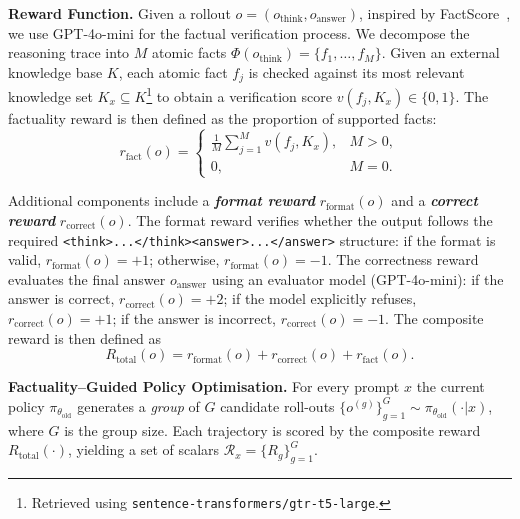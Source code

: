 \medskip
\noindent\textbf{Reward Function.}  
Given a rollout \(o=(o_{\mathrm{think}},o_{\mathrm{answer}})\), inspired by FactScore~\citep{min2023factscore}, we use GPT-4o-mini for the factual verification process. 
We decompose the reasoning trace into \(M\) atomic facts \(\Phi(o_{\mathrm{think}})=\{f_1,\dots,f_M\}\). 
Given an external knowledge base $K$, each atomic fact $f_j$ is checked against its most relevant knowledge set $K_x \subseteq K$\footnote{Retrieved using \texttt{sentence-transformers/gtr-t5-large}.} to obtain a verification score $v(f_j, K_x) \in \{0,1\}$.
The factuality reward is then defined as the proportion of supported facts:
\begin{equation}
\label{eq:factual-score}
r_{\mathrm{fact}}(o)=
\begin{cases}
\displaystyle \frac{1}{M}\sum_{j=1}^{M}v(f_j,K_x), & M>0,\\[6pt]
0, & M=0 .
\end{cases}
\end{equation}

Additional components include a \emph{\textbf{format reward}} \(r_{\mathrm{format}}(o)\) and a \emph{\textbf{correct reward}} \(r_{\mathrm{correct}}(o)\). 
The format reward verifies whether the output follows the required \texttt{<think>...</think><answer>...</answer>} structure: if the format is valid, \(r_{\mathrm{format}}(o)=+1\); otherwise, \(r_{\mathrm{format}}(o)=-1\). 
The correctness reward evaluates the final answer \(o_{\mathrm{answer}}\) using an evaluator model (GPT-4o-mini): if the answer is correct, \(r_{\mathrm{correct}}(o)=+2\); if the model explicitly refuses, \(r_{\mathrm{correct}}(o)=+1\); if the answer is incorrect, \(r_{\mathrm{correct}}(o)=-1\). 
The composite reward is then defined as
\begin{equation}
R_{\mathrm{total}}(o) = r_{\mathrm{format}}(o) + r_{\mathrm{correct}}(o) + r_{\mathrm{fact}}(o).
\end{equation}




\medskip

\noindent\textbf{Factuality–Guided Policy Optimisation.}\;
For every prompt $x$ the current policy
$\pi_{\theta_{\text{old}}}$ generates a \emph{group} of $G$ candidate
roll-outs
$\{o^{(g)}\}_{g=1}^{G}\!\sim\!\pi_{\theta_{\text{old}}}(\cdot|x)$, where
$G$ is the group size. 
Each trajectory is scored by the composite reward
$R_{\mathrm{total}}(\cdot)$, yielding a set of scalars
$\mathcal{R}_x=\{R_g\}_{g=1}^{G}$.


